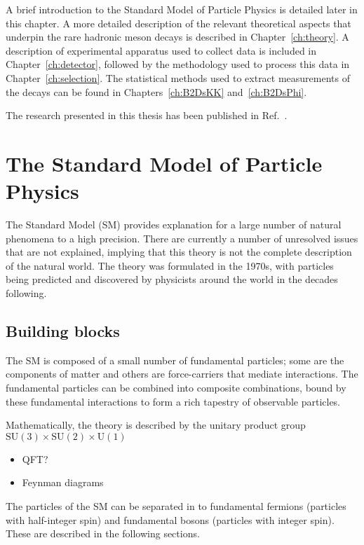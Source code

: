 A brief introduction to the Standard Model of Particle Physics is detailed later in this chapter. A more detailed description of the relevant theoretical aspects that underpin the rare hadronic \B meson decays is described in Chapter~\ref{ch:theory}. A description of experimental apparatus used to collect data is included in Chapter~\ref{ch:detector}, followed by the methodology used to process this data in Chapter~\ref{ch:selection}. The statistical methods used to extract measurements of the decays can be found in Chapters~\ref{ch:B2DsKK} and~\ref{ch:B2DsPhi}.


The research presented in this thesis has been published in Ref.~\cite{LHCb-PAPER-2017-032}. 



\section{The Standard Model of Particle Physics}

The Standard Model (SM) provides explanation for a large number of natural phenomena to a high precision. There are currently a number of unresolved issues that are not explained, implying that this theory is not the complete description of the natural world. The theory was formulated in the 1970s, with particles being predicted and discovered by physicists around the world in the decades following.

\subsection{Building blocks}

The SM is composed of a small number of fundamental particles; some are the components of matter and others are force-carriers that mediate interactions. The fundamental particles can be combined into composite combinations, bound by these fundamental interactions to form a rich tapestry of observable particles.

Mathematically, the theory is described by the unitary product group $\text{SU}(3)\times\text{SU}(2)\times\text{U}(1)$ 



{\color{Red}
\begin{itemize}
\item QFT?
\item Feynman diagrams
\end{itemize}}

The particles of the SM can be separated in to fundamental fermions (particles with half-integer spin) and fundamental bosons (particles with integer spin). These are described in the following sections.  


